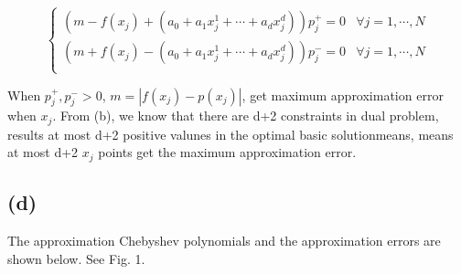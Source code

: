 \documentclass{article}
\newcommand{\1}{\bm 1}
\begin{document}
$$
\begin{cases}
    (m - f(x_j) + (a_0 + a_1x_j^1+\cdots+a_dx_j^d)) p^{+}_j = 0 & \forall j=1, \cdots, N\\
    (m + f(x_j) - (a_0 + a_1x_j^1+\cdots+a_dx_j^d)) p^{-}_j = 0 & \forall j=1, \cdots, N\\
\end{cases}
$$

When $p^{+}_j, p^{-}_j > 0$, $m = |f(x_j) - p(x_j)|$, get maximum approximation error when $x_j$. From (b), we know that there are d+2 constraints in dual problem, results at most d+2 positive valunes in the optimal basic solutionmeans, means at most d+2 $x_j$ points get the maximum approximation error. 

\subsection*{(d)}

The approximation Chebyshev polynomials and the approximation errors are shown below. See Fig. 1.
\end{document}
